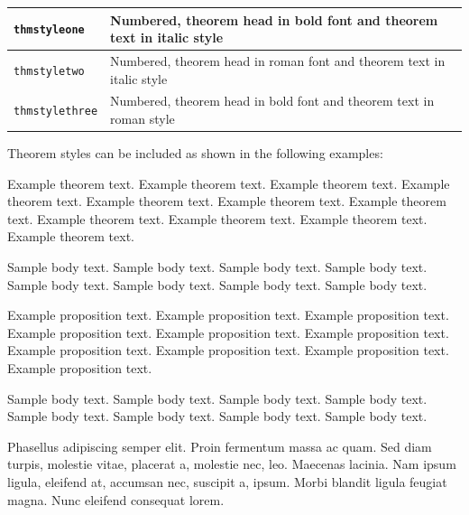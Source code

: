 \documentclass{svproc}
\begin{document}
\bigskip
\begin{tabular}{|l|p{19pc}|}
\hline
\verb+thmstyleone+ & Numbered, theorem head in bold font and theorem text in italic style \\\hline
\verb+thmstyletwo+ & Numbered, theorem head in roman font and theorem text in italic style \\\hline
\verb+thmstylethree+ & Numbered, theorem head in bold font and theorem text in roman style \\\hline
\end{tabular}
\bigskip

Theorem styles can be included as shown in the following examples:

\begin{theorem}\label{thm1}
Example theorem text. Example theorem text. Example theorem text. Example theorem text. Example theorem text. 
Example theorem text. Example theorem text. Example theorem text. Example theorem text. Example theorem text. 
Example theorem text. 
\end{theorem}

Sample body text. Sample body text. Sample body text. Sample body text. Sample body text. Sample body text. Sample body text. Sample body text.

\begin{proposition}
Example proposition text. Example proposition text. Example proposition text. Example proposition text. Example proposition text. 
Example proposition text. Example proposition text. Example proposition text. Example proposition text. Example proposition text. 
\end{proposition}

Sample body text. Sample body text. Sample body text. Sample body text. Sample body text. Sample body text. Sample body text. Sample body text.

\begin{example}
Phasellus adipiscing semper elit. Proin fermentum massa
ac quam. Sed diam turpis, molestie vitae, placerat a, molestie nec, leo. Maecenas lacinia. Nam ipsum ligula, eleifend
at, accumsan nec, suscipit a, ipsum. Morbi blandit ligula feugiat magna. Nunc eleifend consequat lorem. 
\end{example}
\end{document}
